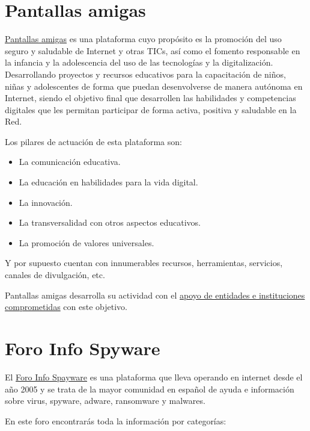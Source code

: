 \documentclass[
  spanish,
  a4paper,
  openany]{book}
\begin{document}
\hypertarget{pantallas-amigas}{%
\section{Pantallas amigas}\label{pantallas-amigas}}

\href{https://www.pantallasamigas.net/}{Pantallas amigas} es una plataforma cuyo propósito es la promoción del uso seguro y saludable de Internet y otras TICs, así como el fomento responsable en la infancia y la adolescencia del uso de las tecnologías y la digitalización. Desarrollando proyectos y recursos educativos para la capacitación de niños, niñas y adolescentes de forma que puedan desenvolverse de manera autónoma en Internet, siendo el objetivo final que desarrollen las habilidades y competencias digitales que les permitan participar de forma activa, positiva y saludable en la Red.

Los pilares de actuación de esta plataforma son:

\begin{itemize}
\item
  La comunicación educativa.
\item
  La educación en habilidades para la vida digital.
\item
  La innovación.
\item
  La transversalidad con otros aspectos educativos.
\item
  La promoción de valores universales.
\end{itemize}

Y por supuesto cuentan con innumerables recursos, herramientas, servicios, canales de divulgación, etc.

Pantallas amigas desarrolla su actividad con el \href{https://www.pantallasamigas.net/confian-en-pantallasamigas/}{apoyo de entidades e instituciones comprometidas} con este objetivo.

\hypertarget{foro-info-spyware}{%
\section{Foro Info Spyware}\label{foro-info-spyware}}

El \href{https://forospyware.com/}{Foro Info Spayware} es una plataforma que lleva operando en internet desde el año 2005 y se trata de la mayor comunidad en español de ayuda e información sobre virus, spyware, adware, ransomware y malwares.

En este foro encontrarás toda la información por categorías:
\end{document}
